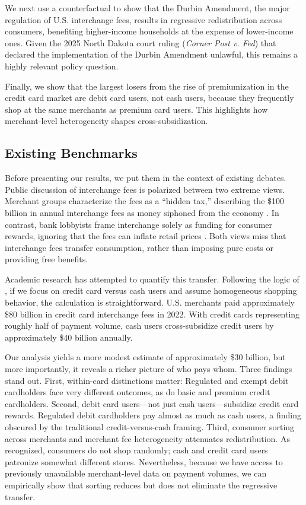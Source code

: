\documentclass[11pt,english]{article}
\theoremstyle{remark}
\begin{document}
We next use a counterfactual to show that the Durbin Amendment, the major regulation of U.S. interchange fees, results in regressive redistribution across consumers, benefiting higher-income households at the expense of lower-income ones.
Given the 2025 North Dakota court ruling (\textit{Corner Post v. Fed}) that declared the implementation of the Durbin Amendment unlawful, this remains a highly relevant policy question.

Finally, we show that the largest losers from the rise of premiumization in the credit card market are debit card users, not cash users, because they frequently shop at the same merchants as premium card users.
This highlights how merchant-level heterogeneity shapes cross-subsidization.

\subsection{Existing Benchmarks}

Before presenting our results, we put them in the context of existing debates.
Public discussion of interchange fees is polarized between two extreme views. 
Merchant groups characterize the fees as a ``hidden tax,'' describing the \$100 billion in annual interchange fees as money siphoned from the economy \citep{MerchantPaymentsCoalition2024}. 
In contrast, bank lobbyists frame interchange solely as funding for consumer rewards, ignoring that the fees can inflate retail prices \citep{BPI2024}. 
Both views miss that interchange fees transfer consumption, rather than imposing pure costs or providing free benefits.

Academic research has attempted to quantify this transfer. Following the logic of \citet{schuh2010gains}, if we focus on credit card versus cash users and assume homogeneous shopping behavior, the calculation is straightforward. U.S. merchants paid approximately \$80 billion in credit card interchange fees in 2022. With credit cards representing roughly half of payment volume, cash users cross-subsidize credit users by approximately \$40 billion annually.

Our analysis yields a more modest estimate of approximately \$30 billion, but more importantly, it reveals a richer picture of who pays whom. Three findings stand out. First, within-card distinctions matter: Regulated and exempt debit cardholders face very different outcomes, as do basic and premium credit cardholders. Second, debit card users---not just cash users---subsidize credit card rewards. Regulated debit cardholders pay almost as much as cash users, a finding obscured by the traditional credit-versus-cash framing. Third, consumer sorting across merchants and merchant fee heterogeneity attenuates redistribution. As \citet{Gans2018} recognized, consumers do not shop randomly; cash and credit card users patronize somewhat different stores. Nevertheless, because we have access to previously unavailable merchant-level data on payment volumes, we can empirically show that sorting reduces but does not eliminate the regressive transfer.
\end{document}
